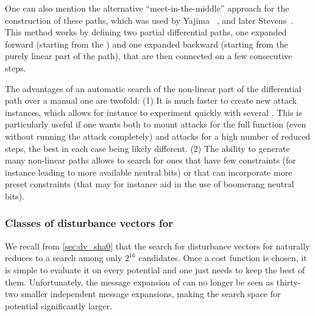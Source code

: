 One can also mention the alternative ``meet-in-the-middle'' approach for the construction of these paths, which was used by Yajima \etal~\cite{DBLP:conf/acisp/YajimaSNISKO07},
and later Stevens~\cite{phdstevens}. This method works by defining two partial differential paths, one expanded forward (\eg starting from the \iv) and one expanded backward
(\eg starting from the purely linear part of the path), that are then connected on a few consecutive steps.

The advantages of an automatic search of the non-linear part of the differential path over a manual one are twofold: (1) It is much faster to create new
attack instances, which allows for instance to experiment quickly with several \dvs. This is particularly useful if one wants both to mount
attacks for the full function (even without running the attack completely) and attacks for a high number of reduced steps, the best \dvs in each case
being likely different. (2) The ability to generate many non-linear paths allows to search for ones that have few constraints (for instance leading
to more available neutral bits) or that can incorporate more preset constraints (that may for instance aid in the use of boomerang neutral bits). 




\subsubsection{Classes of disturbance vectors for \shaone}
\label{sec:sha1_dvs}

We recall from \autoref{sec:dv_sha0} that the search for disturbance vectors for \shazero naturally reduces to a search among only $2^{16}$ candidates. Once a cost function
is chosen, it is simple to evaluate it on every potential \dv and one just needs to keep the best of them. Unfortunately, the message expansion of \shaone can no longer be seen as
thirty-two smaller independent message expansions, making the search space for potential \dvs significantly larger.


